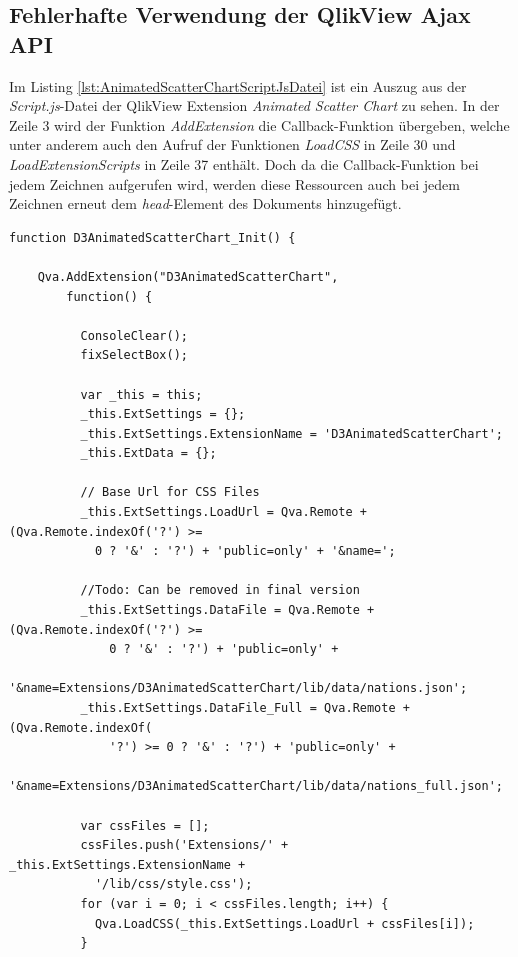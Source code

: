\begin{appendix}
\newpage
\subsection{Fehlerhafte Verwendung der QlikView Ajax API} 
\label{lab:FehlerhafteVerwendungDerQlikViewAjaxAPI} 

Im Listing \ref{lst:AnimatedScatterChartScriptJsDatei} ist ein Auszug aus der \textit{Script.js}-Datei der QlikView Extension \textit{Animated Scatter Chart} zu sehen. In der Zeile 3 wird der Funktion \textit{AddExtension} die Callback-Funktion übergeben, welche unter anderem auch den Aufruf der Funktionen \textit{LoadCSS} in Zeile 30 und \textit{LoadExtensionScripts} in Zeile 37 enthält. Doch da die Callback-Funktion bei jedem Zeichnen aufgerufen wird, werden diese Ressourcen auch bei jedem Zeichnen erneut dem \textit{head}-Element des Dokuments hinzugefügt.

\begin{listing}[htbp]
\begin{verbatim}
function D3AnimatedScatterChart_Init() {

    Qva.AddExtension("D3AnimatedScatterChart",
        function() {

          ConsoleClear();
          fixSelectBox();

          var _this = this;
          _this.ExtSettings = {};
          _this.ExtSettings.ExtensionName = 'D3AnimatedScatterChart';
          _this.ExtData = {};

          // Base Url for CSS Files
          _this.ExtSettings.LoadUrl = Qva.Remote + (Qva.Remote.indexOf('?') >=
            0 ? '&' : '?') + 'public=only' + '&name=';

          //Todo: Can be removed in final version
          _this.ExtSettings.DataFile = Qva.Remote + (Qva.Remote.indexOf('?') >=
              0 ? '&' : '?') + 'public=only' +
            '&name=Extensions/D3AnimatedScatterChart/lib/data/nations.json';
          _this.ExtSettings.DataFile_Full = Qva.Remote + (Qva.Remote.indexOf(
              '?') >= 0 ? '&' : '?') + 'public=only' +
            '&name=Extensions/D3AnimatedScatterChart/lib/data/nations_full.json';

          var cssFiles = [];
          cssFiles.push('Extensions/' + _this.ExtSettings.ExtensionName +
            '/lib/css/style.css');
          for (var i = 0; i < cssFiles.length; i++) {
            Qva.LoadCSS(_this.ExtSettings.LoadUrl + cssFiles[i]);
          }


\end{verbatim}
\end{listing}
\end{appendix}
